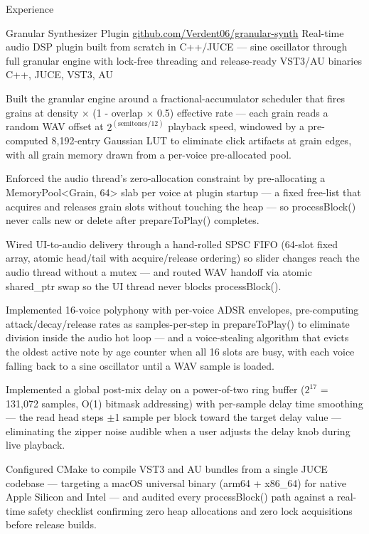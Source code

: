 \documentclass[
	11pt
]{../../../template}
\begin{document}
	\begin{rSection}{E}{xperience}
		\begin{rSectionEntry}
			{Granular Synthesizer Plugin}
			{\href{https://github.com/Verdent06/granular-synth}{github.com/Verdent06/granular-synth}}
			{Real-time audio DSP plugin built from scratch in C++/JUCE --- sine oscillator through full granular engine with lock-free threading and release-ready VST3/AU binaries}
			{C++, JUCE, VST3, AU}
			{}

			\item Built the granular engine around a fractional-accumulator scheduler that fires grains at density $\times$ (1 - overlap $\times$ 0.5) effective rate --- each grain reads a random WAV offset at $2^{(\textrm{semitones}/12)}$ playback speed, windowed by a pre-computed 8,192-entry Gaussian LUT to eliminate click artifacts at grain edges, with all grain memory drawn from a per-voice pre-allocated pool.
			\item Enforced the audio thread's zero-allocation constraint by pre-allocating a MemoryPool\textless{}Grain, 64\textgreater{} slab per voice at plugin startup --- a fixed free-list that acquires and releases grain slots without touching the heap --- so processBlock() never calls new or delete after prepareToPlay() completes.
			\item Wired UI-to-audio delivery through a hand-rolled SPSC FIFO (64-slot fixed array, atomic head/tail with acquire/release ordering) so slider changes reach the audio thread without a mutex --- and routed WAV handoff via atomic shared\_ptr swap so the UI thread never blocks processBlock().
			\item Implemented 16-voice polyphony with per-voice ADSR envelopes, pre-computing attack/decay/release rates as samples-per-step in prepareToPlay() to eliminate division inside the audio hot loop --- and a voice-stealing algorithm that evicts the oldest active note by age counter when all 16 slots are busy, with each voice falling back to a sine oscillator until a WAV sample is loaded.
			\item Implemented a global post-mix delay on a power-of-two ring buffer ($2^{17}$ = 131,072 samples, O(1) bitmask addressing) with per-sample delay time smoothing --- the read head steps $\pm$1 sample per block toward the target delay value --- eliminating the zipper noise audible when a user adjusts the delay knob during live playback.
			\item Configured CMake to compile VST3 and AU bundles from a single JUCE codebase --- targeting a macOS universal binary (arm64 + x86\_64) for native Apple Silicon and Intel --- and audited every processBlock() path against a real-time safety checklist confirming zero heap allocations and zero lock acquisitions before release builds.
		\end{rSectionEntry}


\end{rSection}
\end{document}
